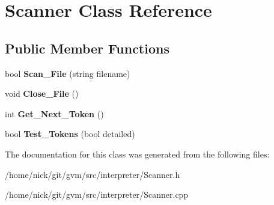 \hypertarget{classScanner}{\section{Scanner Class Reference}
\label{classScanner}
}
\subsection*{Public Member Functions}
\begin{DoxyCompactItemize}
\item 
\hypertarget{classScanner_adb4db4501de3524cb83afd0af51ce0a8}{bool {\bfseries Scan\-\_\-\-File} (string filename)}\label{classScanner_adb4db4501de3524cb83afd0af51ce0a8}

\item 
\hypertarget{classScanner_aaef6999cc795a5027d18022385d5da45}{void {\bfseries Close\-\_\-\-File} ()}\label{classScanner_aaef6999cc795a5027d18022385d5da45}

\item 
\hypertarget{classScanner_a09ebc084aea99d1a0a58975e84b6eabb}{int {\bfseries Get\-\_\-\-Next\-\_\-\-Token} ()}\label{classScanner_a09ebc084aea99d1a0a58975e84b6eabb}

\item 
\hypertarget{classScanner_ad0e93319cc105e1831799781f067a334}{bool {\bfseries Test\-\_\-\-Tokens} (bool detailed)}\label{classScanner_ad0e93319cc105e1831799781f067a334}

\end{DoxyCompactItemize}


The documentation for this class was generated from the following files\-:\begin{DoxyCompactItemize}
\item 
/home/nick/git/gvm/src/interpreter/Scanner.\-h\item 
/home/nick/git/gvm/src/interpreter/Scanner.\-cpp\end{DoxyCompactItemize}
